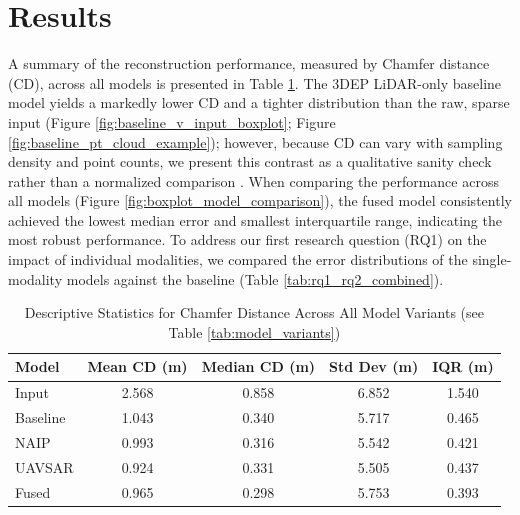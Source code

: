 \documentclass[remotesensing,article,submit,pdftex,moreauthors]{Definitions/mdpi}
\begin{document}
\section{Results}

A summary of the reconstruction performance, measured by Chamfer distance (CD), across all models is presented in Table \ref{tab:descriptive_stats}.
The 3DEP LiDAR-only baseline model yields a markedly lower CD and a tighter distribution than the raw, sparse input (Figure \ref{fig:baseline_v_input_boxplot}; Figure \ref{fig:baseline_pt_cloud_example}); however, because CD can vary with sampling density and point counts, we present this contrast as a qualitative sanity check rather than a normalized comparison \citep{wu2021dcd,gradpu2023}.
When comparing the performance across all models (Figure \ref{fig:boxplot_model_comparison}), the fused model consistently achieved the lowest median error and smallest interquartile range, indicating the most robust performance. To address our first research question (RQ1) on the impact of individual modalities, we compared the error distributions of the single-modality models against the baseline (Table \ref{tab:rq1_rq2_combined}).


\begin{table}[htbp]
\centering
\caption{Descriptive Statistics for Chamfer Distance Across All Model Variants (see Table \ref{tab:model_variants})}
\begin{tabular}{lcccc}
\toprule
\textbf{Model} & \textbf{Mean CD (m)} & \textbf{Median CD (m)} & \textbf{Std Dev (m)} & \textbf{IQR (m)} \\
\midrule
Input & 2.568 & 0.858 & 6.852 & 1.540 \\
Baseline & 1.043 & 0.340 & 5.717 & 0.465 \\
NAIP & 0.993 & 0.316 & 5.542 & 0.421 \\
UAVSAR & 0.924 & 0.331 & 5.505 & 0.437 \\
Fused & 0.965 & 0.298 & 5.753 & 0.393 \\
\bottomrule
\end{tabular}
\label{tab:descriptive_stats}
\end{table}
\end{document}
